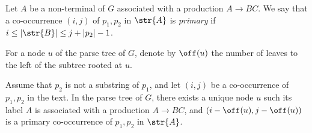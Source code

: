 \begin{definition}
Let $A$ be a non-terminal of $G$ associated with a production $A \rightarrow BC$. We say that a co-occurrence $(i,j)$ of $p_1, p_2$ in $\str{A}$ is \emph{primary} if $i \le |\str{B}| \le j + |p_2|-1$.   
\end{definition}

\noindent For a node $u$ of the parse tree of $G$, denote by $\off(u)$ the number of leaves to the left of the subtree rooted at $u$.

\begin{observation}
\label{obs:primarycoocc}
Assume that $p_2$ is not a substring of $p_1$, and let $(i,j)$ be a co-occurrence of $p_1,p_2$ in the text. In the parse tree of $G$, there exists a unique node $u$ such its label $A$ is associated with a production $A \rightarrow BC$, and $(i-\off(u),j-\off(u))$ is a primary co-occurrence of $p_1,p_2$ in $\str{A}$.
\end{observation}
       
